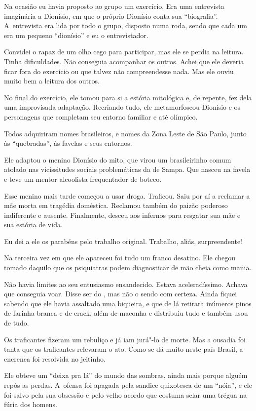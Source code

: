 Na ocasião eu havia proposto ao grupo um exercício. Era uma entrevista
imaginária a Dionísio, em que o próprio Dionísio conta sua
``biografia''. A~entrevista era lida por todo o grupo, disposto numa
roda, sendo que cada um era um pequeno ``dionísio'' e eu o
entrevistador.

Convidei o rapaz de um olho cego para participar, mas ele se perdia na
leitura. Tinha dificuldades. Não conseguia acompanhar os outros. Achei
que ele deveria ficar fora do exercício ou que talvez não compreendesse
nada. Mas ele ouviu muito bem a leitura dos outros.

No final do exercício, ele tomou para si a estória mitológica e, de
repente, fez dela uma improvisada adaptação. Recriando tudo, ele
metamorfoseou Dionísio e os personagens que completam seu entorno
familiar e até olímpico.

Todos adquiriram nomes brasileiros, e nomes da Zona Leste de São Paulo,
junto às ``quebradas'', às favelas e seus entornos.

Ele adaptou o menino Dionísio do mito, que virou um brasileirinho comum
atolado nas vicissitudes sociais problemáticas da  de Sampa. Que
nasceu na favela e teve um mentor alcoolista frequentador de boteco.

Esse menino mais tarde começou a usar droga. Traficou. Saiu por aí a
reclamar a mãe morta em tragédia doméstica. Reclamou também do paizão
poderoso indiferente e ausente. Finalmente, desceu aos infernos para
resgatar sua mãe e sua estória de vida.

Eu dei a ele os parabéns pelo trabalho original. Trabalho, aliás,
surpreendente!

\asterisc{}

Na terceira vez em que ele apareceu foi tudo um franco desatino. Ele
chegou tomado daquilo que os psiquiatras podem diagnosticar de mão cheia
como mania.

Não havia limites ao seu entusiasmo ensandecido. Estava aceleradíssimo.
Achava que conseguia voar. Disse ser do , mas não o sendo com
certeza. Ainda fiquei sabendo que ele havia assaltado uma biqueira, e
que de lá retirara inúmeros pinos de farinha branca e de crack, além de
maconha e distribuiu tudo e também usou de tudo.

Os traficantes fizeram um rebuliço e já iam jurá"-lo de morte. Mas a
ousadia foi tanta que os traficantes relevaram o ato. Como se dá muito
neste país Brasil, a encrenca foi resolvida no jeitinho.

Ele obteve um ``deixa pra lá'' do mundo das sombras, ainda mais porque
alguém repôs as perdas. A~ofensa foi apagada pela sandice quixotesca de
um ``nóia'', e ele foi salvo pela sua obsessão e pelo velho acordo que
costuma selar uma trégua na fúria dos homens.

